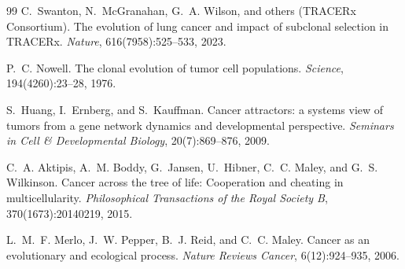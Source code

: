 \documentclass[11pt]{article}
\begin{document}
\begin{thebibliography}{99}
C.~Swanton, N.~McGranahan, G.~A. Wilson, and others (TRACERx Consortium).
\newblock The evolution of lung cancer and impact of subclonal selection
  in {TRACERx}.
\newblock \emph{Nature}, 616(7958):525--533, 2023.

P.~C. Nowell.
\newblock The clonal evolution of tumor cell populations.
\newblock \emph{Science}, 194(4260):23--28, 1976.

S.~Huang, I.~Ernberg, and S.~Kauffman.
\newblock Cancer attractors: a systems view of tumors from a gene network
  dynamics and developmental perspective.
\newblock \emph{Seminars in Cell \& Developmental Biology}, 20(7):869--876,
  2009.

C.~A. Aktipis, A.~M. Boddy, G.~Jansen, U.~Hibner, C.~C. Maley, and
  G.~S. Wilkinson.
\newblock Cancer across the tree of life: Cooperation and cheating in
  multicellularity.
\newblock \emph{Philosophical Transactions of the Royal Society B},
  370(1673):20140219, 2015.

L.~M.~F. Merlo, J.~W. Pepper, B.~J. Reid, and C.~C. Maley.
\newblock Cancer as an evolutionary and ecological process.
\newblock \emph{Nature Reviews Cancer}, 6(12):924--935, 2006.

\end{thebibliography}

\clearpage
\appendix
\end{document}
